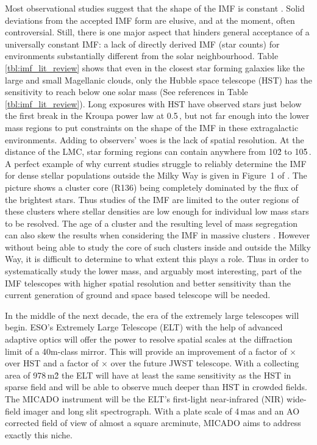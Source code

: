 Most observational studies suggest that the shape of the IMF is constant \citep{Kroupa2002,Bastian2010}. Solid deviations from the accepted IMF form are elusive, and at the moment, often controversial. Still, there is one major aspect that hinders general acceptance of a universally constant IMF: a lack of directly derived IMF (star counts) for environments substantially different from the solar neighbourhood. Table \ref{tbl:imf_lit_review} shows that even in the closest star forming galaxies like the large and small Magellanic clouds, only the Hubble space telescope (HST) has the sensitivity to reach below one solar mass (See references in Table \ref{tbl:imf_lit_review}). Long exposures with HST have observed stars just below the first break in the Kroupa power law at 0.5\,\msun \citep{dario2009,kalirai2013,geha2013}, but not far enough into the lower mass regions to put constraints on the shape of the IMF in these extragalactic environments. Adding to observers' woes is the lack of spatial resolution. At the distance of the LMC, star forming regions can contain anywhere from 10\h2 to 10\h5\,\spa. A perfect example of why current studies struggle to reliably determine the IMF for dense stellar populations outside the Milky Way is given in Figure~1 of \citet{sirianni2000}. The picture shows a cluster core (R136) being completely dominated by the flux of the brightest stars. Thus studies of the IMF are limited to the outer regions of these clusters where stellar densities are low enough for individual low mass stars to be resolved. The age of a cluster and the resulting level of mass segregation can also skew the results when considering the IMF in massive clusters \citep{lim2013}. However without being able to study the core of such clusters inside and outside the Milky Way, it is difficult to determine to what extent this plays a role. Thus in order to systematically study the lower mass, and arguably most interesting, part of the IMF telescopes with higher spatial resolution and better sensitivity than the current generation of ground and space based telescope will be needed.

In the middle of the next decade, the era of the extremely large telescopes will begin. ESO's Extremely Large Telescope (ELT) \citep{eelt} with the help of advanced adaptive optics \citep{maory} will offer the power to resolve spatial scales at the diffraction limit of a 40m-class mirror. This will provide an improvement of a factor of $\times$ over HST and a factor of $\times$ over the future JWST telescope. With a collecting area of 978\,m\h2 the ELT will have at least the same sensitivity as the HST in sparse field and will be able to observe much deeper than HST in crowded fields. The MICADO instrument \citep{micado, micado2016} will be the ELT's first-light near-infrared (NIR) wide-field imager and long slit spectrograph. With a plate scale of 4\,mas and an AO corrected field of view of almost a square arcminute, MICADO aims to address exactly this niche. 

